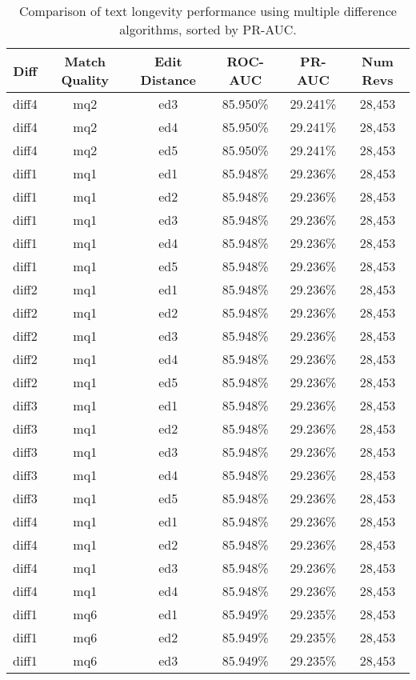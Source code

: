 \begin{table}[tbph]
\begin{center}
\begin{tabular}{|c|c|c||c|c|c|}
\hline
Diff & Match Quality & Edit Distance & ROC-AUC & PR-AUC & Num Revs \\
\hline
\hline
diff4 & mq2 & ed3 & 85.950\% & 29.241\% & 28,453 \\
diff4 & mq2 & ed4 & 85.950\% & 29.241\% & 28,453 \\
diff4 & mq2 & ed5 & 85.950\% & 29.241\% & 28,453 \\
diff1 & mq1 & ed1 & 85.948\% & 29.236\% & 28,453 \\
diff1 & mq1 & ed2 & 85.948\% & 29.236\% & 28,453 \\
diff1 & mq1 & ed3 & 85.948\% & 29.236\% & 28,453 \\
diff1 & mq1 & ed4 & 85.948\% & 29.236\% & 28,453 \\
diff1 & mq1 & ed5 & 85.948\% & 29.236\% & 28,453 \\
diff2 & mq1 & ed1 & 85.948\% & 29.236\% & 28,453 \\
diff2 & mq1 & ed2 & 85.948\% & 29.236\% & 28,453 \\
diff2 & mq1 & ed3 & 85.948\% & 29.236\% & 28,453 \\
diff2 & mq1 & ed4 & 85.948\% & 29.236\% & 28,453 \\
diff2 & mq1 & ed5 & 85.948\% & 29.236\% & 28,453 \\
diff3 & mq1 & ed1 & 85.948\% & 29.236\% & 28,453 \\
diff3 & mq1 & ed2 & 85.948\% & 29.236\% & 28,453 \\
diff3 & mq1 & ed3 & 85.948\% & 29.236\% & 28,453 \\
diff3 & mq1 & ed4 & 85.948\% & 29.236\% & 28,453 \\
diff3 & mq1 & ed5 & 85.948\% & 29.236\% & 28,453 \\
diff4 & mq1 & ed1 & 85.948\% & 29.236\% & 28,453 \\
diff4 & mq1 & ed2 & 85.948\% & 29.236\% & 28,453 \\
diff4 & mq1 & ed3 & 85.948\% & 29.236\% & 28,453 \\
diff4 & mq1 & ed4 & 85.948\% & 29.236\% & 28,453 \\
diff1 & mq6 & ed1 & 85.949\% & 29.235\% & 28,453 \\
diff1 & mq6 & ed2 & 85.949\% & 29.235\% & 28,453 \\
diff1 & mq6 & ed3 & 85.949\% & 29.235\% & 28,453 \\
\hline
\end{tabular}
\end{center}
\caption{Comparison of text longevity performance using
    multiple difference algorithms, sorted by PR-AUC.}
\label{tab:textshout}
\end{table}
